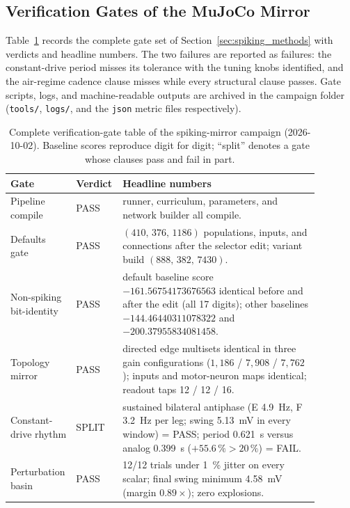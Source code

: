 \subsection{Verification Gates of the MuJoCo Mirror}

Table~\ref{tab:app_spk_gates} records the complete gate set of Section~\ref{sec:spiking_methods} with verdicts and headline numbers. The two failures are reported as failures: the constant-drive period misses its tolerance with the tuning knobs identified, and the air-regime cadence clause misses while every structural clause passes. Gate scripts, logs, and machine-readable outputs are archived in the campaign folder (\texttt{tools/}, \texttt{logs/}, and the \texttt{json} metric files respectively).

\begin{table}
\caption{Complete verification-gate table of the spiking-mirror campaign (2026-10-02). Baseline scores reproduce digit for digit; ``split'' denotes a gate whose clauses pass and fail in part.}
\label{tab:app_spk_gates}
\begin{tabular}{@{}p{0.16\linewidth}p{0.10\linewidth}p{0.62\linewidth}@{}}
\toprule
\textbf{Gate} & \textbf{Verdict} & \textbf{Headline numbers} \\
\midrule
Pipeline compile & PASS & runner, curriculum, parameters, and network builder all compile. \\
Defaults gate & PASS & $(410,\,376,\,1186)$ populations, inputs, and connections after the selector edit; variant build $(888,\,382,\,7430)$. \\
Non-spiking bit-identity & PASS & default baseline score $-161.56754173676563$ identical before and after the edit (all 17 digits); other baselines $-144.46440311078322$ and $-200.37955834081458$. \\
Topology mirror & PASS & directed edge multisets identical in three gain configurations ($1{,}186$ / $7{,}908$ / $7{,}762$); inputs and motor-neuron maps identical; readout taps 12 / 12 / 16. \\
Constant-drive rhythm & SPLIT & sustained bilateral antiphase (E \qty{4.9}{\hertz}, F \qty{3.2}{\hertz} per leg; swing \qty{5.13}{\mV} in every window) = PASS; period \qty{0.621}{\second} versus analog \qty{0.399}{\second} ($+55.6\,\% > 20\,\%$) = FAIL. \\
Perturbation basin & PASS & 12/12 trials under \qty{1}{\percent} jitter on every scalar; final swing minimum \qty{4.58}{\mV} (margin $0.89\times$); zero explosions. \\

\end{tabular}
\end{table}
